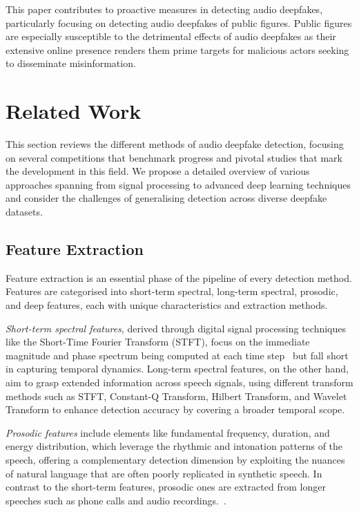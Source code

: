 \documentclass{Interspeech}
\begin{document}
This paper contributes to proactive measures in detecting audio deepfakes,
particularly focusing on detecting audio deepfakes of public figures. Public
figures are especially susceptible to the detrimental effects of audio
deepfakes as their extensive online presence renders them prime targets for
malicious actors seeking to disseminate misinformation.

\section{Related Work}
\label{sec:related_work}

This section reviews the different methods of audio deepfake detection,
focusing on several competitions that benchmark progress and pivotal studies
that mark the development in this field. We propose a detailed overview of
various approaches spanning from signal processing to advanced deep learning
techniques and consider the challenges of generalising detection across diverse
deepfake datasets.

\subsection{Feature Extraction}

Feature extraction is an essential phase of the pipeline of every detection
method. Features are categorised into short-term spectral, long-term spectral,
prosodic, and deep features, each with unique characteristics and extraction
methods.

\textit{Short-term spectral features}, derived through digital signal processing techniques like the Short-Time Fourier Transform (STFT), focus on the immediate magnitude and phase spectrum being computed at each time step~\cite{tian2016spoofing} but fall short in capturing temporal dynamics. Long-term spectral features, on the other hand, aim to grasp extended information across speech signals, using different transform methods such as STFT, Constant-Q Transform, Hilbert Transform, and Wavelet Transform to enhance detection accuracy by covering a broader temporal scope.

\textit{Prosodic features} include elements like fundamental frequency, duration, and energy distribution, which leverage the rhythmic and intonation patterns of the speech, offering a complementary detection dimension by exploiting the nuances of natural language that are often poorly replicated in synthetic speech. In contrast to the short-term features, prosodic ones are extracted from longer speeches such as phone calls and audio recordings.~\cite{kinnunen2010overview}.
\end{document}
